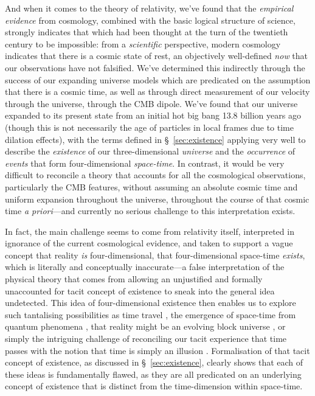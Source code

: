 \documentclass[aps,rmp,groupedaddress,twocolumn,10pt]{revtex4-2}
\begin{document}
And when it comes to the theory of relativity, we've found that the \textit{empirical evidence} from cosmology, combined with the basic logical structure of science, strongly indicates that which had been thought at the turn of the twentieth century to be impossible: from a \textit{scientific} perspective, modern cosmology indicates that there is a cosmic state of rest, an objectively well-defined \textit{now} that our observations have not falsified. We've determined this indirectly through the success of our expanding universe models which are predicated on the assumption that there is a cosmic time, as well as through direct measurement of our velocity through the universe, through the CMB dipole. We've found that our universe expanded to its present state from an initial hot big bang 13.8 billion years ago (though this is not necessarily the age of particles in local frames due to time dilation effects), with the terms defined in \S~\ref{sec:existence} applying very well to describe the \textit{existence} of our three-dimensional \textit{universe} and the \textit{occurrence} of \textit{events} that form four-dimensional \textit{space-time}. In contrast, it would be very difficult to reconcile a theory that accounts for all the cosmological observations, particularly the CMB features, without assuming an absolute cosmic time and uniform expansion throughout the universe, throughout the course of that cosmic time \textit{a priori}---and currently no serious challenge to this interpretation exists.

In fact, the main challenge seems to come from relativity itself, interpreted in ignorance of the current cosmological evidence, and taken to support a vague concept that reality \textit{is} four-dimensional, that four-dimensional space-time \textit{exists}, which is literally and conceptually inaccurate---a false interpretation of the physical theory that comes from allowing an unjustified and formally unaccounted for tacit concept of existence to sneak into the general idea undetected. This idea of four-dimensional existence then enables us to explore such tantalising possibilities as time travel \cite{Morris1988,Hawking1992,Thorne1994,Visser1995}, the emergence of space-time from quantum phenomena \cite{Carroll2019}, that reality might be an evolving block universe \cite{Ellis2014}, or simply the intriguing challenge of reconciling our tacit experience that time passes with the notion that time is simply an illusion \cite{barbour2001,davies2002,Greene2004,callender2017,rovelli2019}. Formalisation of that tacit concept of existence, as discussed in \S~\ref{sec:existence}, clearly shows that each of these ideas is fundamentally flawed, as they are all predicated on an underlying concept of existence that is distinct from the time-dimension within space-time. 
\end{document}
